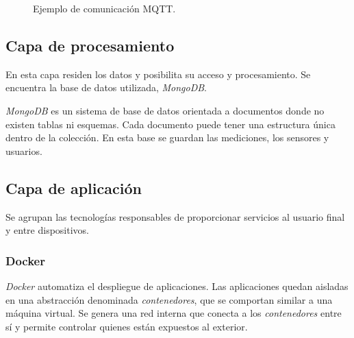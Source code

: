 			\begin{figure}[h]
				\centering
				\caption{Ejemplo de comunicación MQTT.}
				\label{fig:mqttEjemplo}
			\end{figure}
	
	\subsection{Capa de procesamiento}
	\label{capaProcesamiento}
	
		En esta capa residen los datos y posibilita su acceso y procesamiento. Se encuentra la base de datos utilizada, \emph{MongoDB}.
		
		\emph{MongoDB} es un sistema de base de datos orientada a documentos donde no existen tablas ni esquemas. Cada documento puede tener una estructura única dentro de la colección. En esta base se guardan las mediciones, los sensores y usuarios.
	
	\subsection{Capa de aplicación}
	\label{capaAplicacion}
	
		Se agrupan las tecnologías responsables de proporcionar servicios al usuario final y entre dispositivos.
		
		\subsubsection{Docker}
		
			\emph{Docker} automatiza el despliegue de aplicaciones. Las aplicaciones quedan aisladas en una abstracción denominada \emph{contenedores}, que se comportan similar a una máquina virtual. Se genera una red interna que conecta a los \emph{contenedores} entre sí y permite controlar quienes están expuestos al exterior.
		

